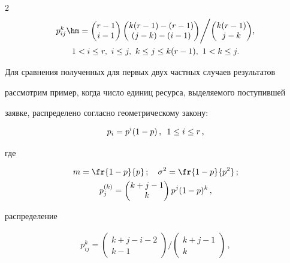 \begin{multicols}{2}
\begin{multline*}
  \hspace*{-0.26108pt}p_{ij}^k \hm= {\begin{pmatrix} r-1\\ i-1\end{pmatrix} \begin{pmatrix} k(r-1)-

(r-1)\\ (j-k) -(i-1)\end{pmatrix}}\Bigg/ {\begin{pmatrix} k(r-1)\\ j-k\end{pmatrix}},

\\ 

1< i\leq r,\ i\leq j,\ k\leq j \leq k(r-1),\ 1<k\leq j.

\end{multline*}

  

  Для сравнения полученных для первых двух частных случаев результатов 

рассмотрим пример, когда число единиц ресурса, выделяемого поступившей 

заявке, распределено согласно геометрическому закону: 

$$

p_i= p^i(1-p)\,, \enskip

1\leq i\leq r\,,

$$

где 

\begin{gather*}

m= \fr{1-p}{p}\,;\quad \sigma^2= \fr{1-p}{p^2}\,; \\

p_j^{(k)} = \begin{pmatrix} k+j-1\\ k\end{pmatrix} p^j (1-p)^k\,, 

\end{gather*}

распределение 

\begin{multline*}

p_{ij}^k = \begin{pmatrix} k+j-i-2\\ k-1\end{pmatrix} \Bigg/ 

\begin{pmatrix} k+j-1\\ k\end{pmatrix}\,,\\


\end{multline*}
\end{multicols}
